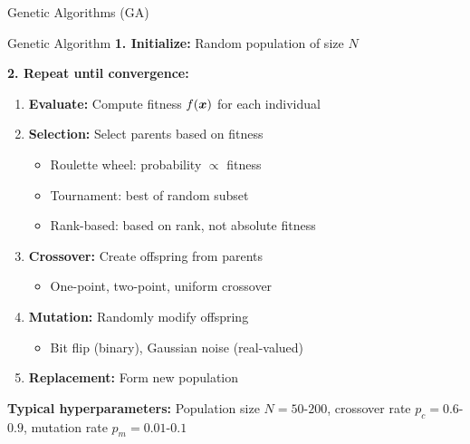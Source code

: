 \documentclass[aspectratio=169]{beamer}
\begin{document}
\begin{frame}{Genetic Algorithms (GA)}
  \begin{examplebox}{Genetic Algorithm}
    \textbf{1. Initialize:} Random population of size $N$

    \textbf{2. Repeat until convergence:}
    \begin{enumerate}
      \item \textbf{Evaluate:} Compute fitness $f(\boldsymbol{x})$ for each individual
      \item \textbf{Selection:} Select parents based on fitness
      \begin{itemize}
        \item Roulette wheel: probability $\propto$ fitness
        \item Tournament: best of random subset
        \item Rank-based: based on rank, not absolute fitness
      \end{itemize}
      \item \textbf{Crossover:} Create offspring from parents
      \begin{itemize}
        \item One-point, two-point, uniform crossover
      \end{itemize}
      \item \textbf{Mutation:} Randomly modify offspring
      \begin{itemize}
        \item Bit flip (binary), Gaussian noise (real-valued)
      \end{itemize}
      \item \textbf{Replacement:} Form new population
    \end{enumerate}
  \end{examplebox}

  \textbf{Typical hyperparameters:} Population size $N = 50$-$200$, crossover rate $p_c = 0.6$-$0.9$, mutation rate $p_m = 0.01$-$0.1$
\end{frame}
\end{document}
